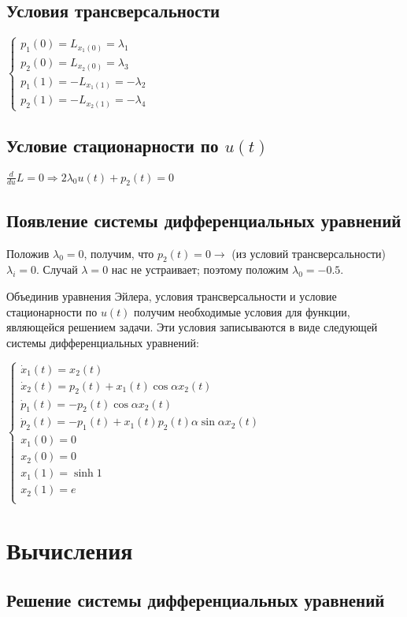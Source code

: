 \documentclass[24pt]{article}
\begin{document}
\subsection{Условия трансверсальности}
$
\begin{cases}
p_1(0) = L_{x_1(0)} = \lambda_1\\
p_2(0) = L_{x_2(0)} = \lambda_3\\
p_1(1) = -L_{x_1(1)} = -\lambda_2\\
p_2(1) = -L_{x_2(1)} = -\lambda_4
\end{cases}
$
\subsection{Условие стационарности по $u(t)$}
$
\frac{d}{du}L = 0 \Rightarrow 2\lambda_0u(t) + p_2(t) = 0
$
\subsection{Появление системы дифференциальных уравнений}
Положив $\lambda_0 = 0$, получим, что $p_2(t) = 0 \rightarrow$ (из условий трансверсальности) $\lambda_i = 0$. Случай $\lambda = 0$ нас не устраивает; поэтому положим $\lambda_0 = -0.5$.

Объединив уравнения Эйлера, условия трансверсальности и условие стационарности по $u(t)$ получим необходимые условия для функции, являющейся решением задачи. Эти условия записываются в виде следующей системы дифференциальных уравнений:

$
\begin{cases}
\dot x_1(t) = x_2(t)\\
\dot x_2(t) = p_2(t) +x_1(t)\cos\alpha x_2 (t)\\
\dot p_1(t) = -p_2(t)\cos\alpha x_2(t)\\
\dot p_2(t) = -p_1(t) + x_1(t)p_2(t)\alpha\sin\alpha x_2(t)\\
x_1(0) = 0\\
x_2(0) = 0\\
x_1(1) = \sinh 1\\
x_2(1) = e\\
\end{cases}
$
\section{Вычисления}
\subsection{Решение системы дифференциальных уравнений}
\end{document}

